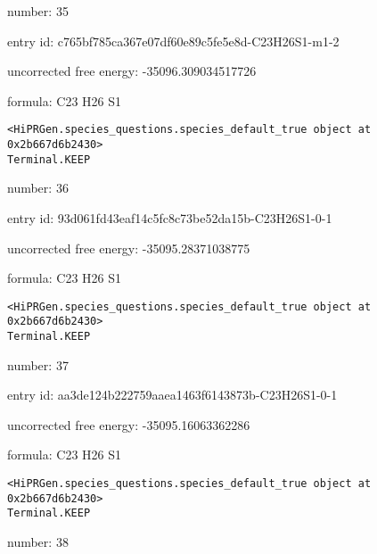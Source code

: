 \documentclass{article}
\begin{document}
number: 35



entry id: c765bf785ca367e07df60e89c5fe5e8d-C23H26S1-m1-2



uncorrected free energy: -35096.309034517726



formula: C23 H26 S1


\vspace{1cm}
\begin{verbatim}
<HiPRGen.species_questions.species_default_true object at 0x2b667d6b2430>
Terminal.KEEP
\end{verbatim}


number: 36



entry id: 93d061fd43eaf14c5fc8c73be52da15b-C23H26S1-0-1



uncorrected free energy: -35095.28371038775



formula: C23 H26 S1


\vspace{1cm}
\begin{verbatim}
<HiPRGen.species_questions.species_default_true object at 0x2b667d6b2430>
Terminal.KEEP
\end{verbatim}


number: 37



entry id: aa3de124b222759aaea1463f6143873b-C23H26S1-0-1



uncorrected free energy: -35095.16063362286



formula: C23 H26 S1


\vspace{1cm}
\begin{verbatim}
<HiPRGen.species_questions.species_default_true object at 0x2b667d6b2430>
Terminal.KEEP
\end{verbatim}


number: 38
\end{document}
